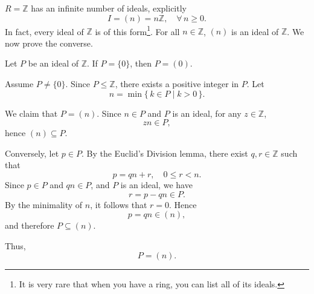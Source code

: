 \begin{example}
\(R=\mathbb{Z}\) has an infinite number of ideals, explicitly
\[
I=(n)=n\mathbb{Z}, \quad \forall\, n\ge 0.
\]
In fact, every ideal of \(\mathbb{Z}\) is of this form\footnote{It is very rare that when you have a ring, you can list all of its ideals.}. For all \(n\in\mathbb{Z}\), \((n)\) is an ideal of \(\mathbb{Z}\).
We now prove the converse.

Let \(P\) be an ideal of \(\mathbb{Z}\).
If \(P=\{0\}\), then \(P=(0)\).

Assume \(P\neq \{0\}\). Since \(P\leq \mathbb{Z}\), there exists a positive integer in \(P\).
Let
\[
n=\min\{\,k\in P \mid k>0\,\}.
\]

We claim that \(P=(n)\).
Since \(n\in P\) and \(P\) is an ideal, for any \(z\in\mathbb{Z}\),
\[
zn\in P,
\]
hence \((n)\subseteq P\).

Conversely, let \(p\in P\). By the Euclid's Division lemma, there exist \(q,r\in\mathbb{Z}\) such that
\[
p=qn+r, \quad 0\le r<n.
\]
Since \(p\in P\) and \(qn\in P\), and \(P\) is an ideal, we have
\[
r=p-qn\in P.
\]
By the minimality of \(n\), it follows that \(r=0\). Hence
\[
p=qn\in (n),
\]
and therefore \(P\subseteq (n)\).

Thus,
\[
P=(n).
\]

\end{example}

